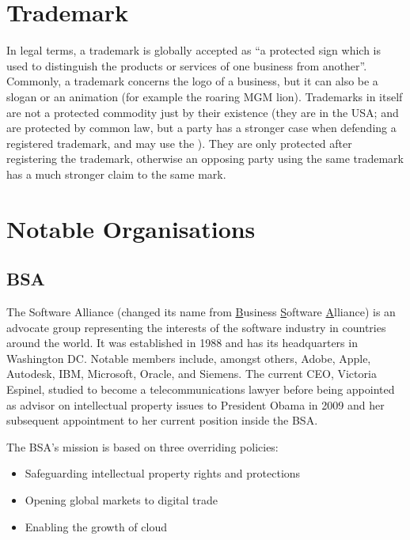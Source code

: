 \documentclass[a4paper]{report}
\begin{document}
\section{Trademark}
\label{sec:Trademark}
In legal terms, a trademark is globally accepted as \textquotedblleft a protected sign which is used to distinguish the products or services of one business from another\textquotedblright \parencite{SwissFederalInstituteofIntellectualProperty2017}.
Commonly, a trademark concerns the logo of a business, but it can also be a slogan or an animation (for example the roaring MGM lion).
Trademarks in itself are not a protected commodity just by their existence (they are in the USA; and are protected by common law, but a party has a stronger case when defending a registered trademark, and may use the \textregistered). They are only protected after registering the trademark, otherwise an opposing party using the same trademark has a much stronger claim to the same mark. \parencite{StatesPatent2016}

\section{Notable Organisations}
\label{sec:Orgas}

\subsection{BSA}
\label{ssec:BSA}
The Software Alliance (changed its name from \underline{B}usiness \underline{S}oftware \underline{A}lliance) is an advocate group representing the interests of the software industry in countries around the world. It was established in 1988 and has its headquarters in Washington DC. Notable members include, amongst others, Adobe, Apple, Autodesk, IBM, Microsoft, Oracle, and Siemens. The current CEO, Victoria Espinel, studied to become a telecommunications lawyer before being appointed as advisor on intellectual property issues to President Obama in 2009 and her subsequent appointment to her current position inside the BSA. \parencite{Rogers2017}
\vspace{\baselineskip}

\noindent The BSA's mission is based on three overriding policies:
\begin{itemize}
	\item Safeguarding intellectual property rights and protections
	\item Opening global markets to digital trade
	\item Enabling the growth of cloud 
\end{itemize}
\parencite{BSA2017}
\end{document}

